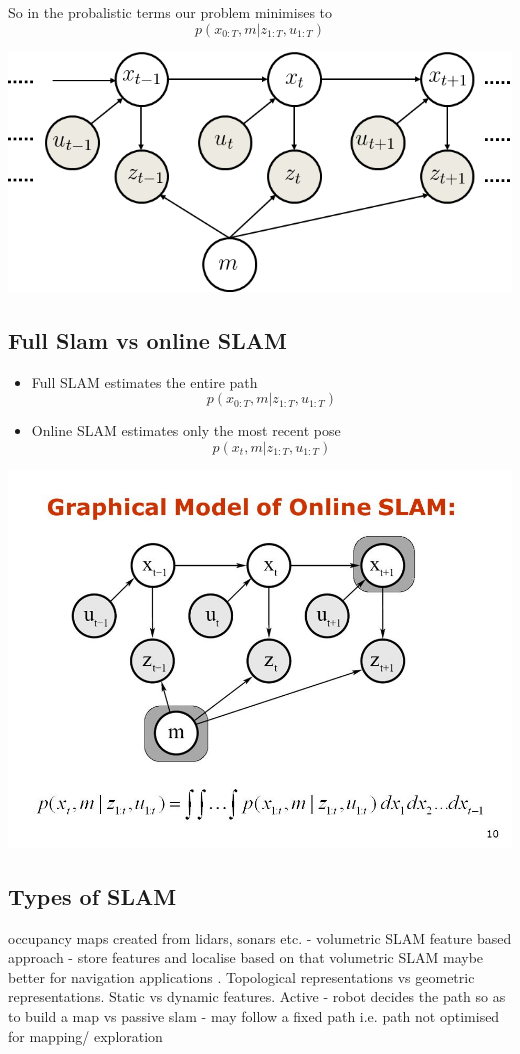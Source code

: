 \documentclass{article}
\begin{document}
So in the probalistic terms our problem minimises to 
$$p(x_{0:T},m|z_{1:T},u_{1:T})$$


\includegraphics[width = \linewidth]{graphical_model.png}
\subsection{Full Slam vs online SLAM}
    \begin{itemize}
        \item Full SLAM estimates the entire path $$p(x_{0:T},m|z_{1:T},u_{1:T})$$
        \item Online SLAM estimates only the most recent pose $$p(x_{t},m|z_{1:T},u_{1:T})$$
    \end{itemize}
\includegraphics[width = \linewidth]{online_SLAM.jpg}

\subsection{Types of SLAM}
    occupancy maps created from lidars, sonars etc. - volumetric SLAM
    feature based approach - store features and localise based on that 
    volumetric SLAM maybe  better for navigation applications . 
    Topological representations vs geometric representations.
    Static vs dynamic features.
    Active - robot decides the path so as to build a map vs passive slam -
    may follow a fixed path i.e. path not optimised for mapping/ exploration
\end{document}
